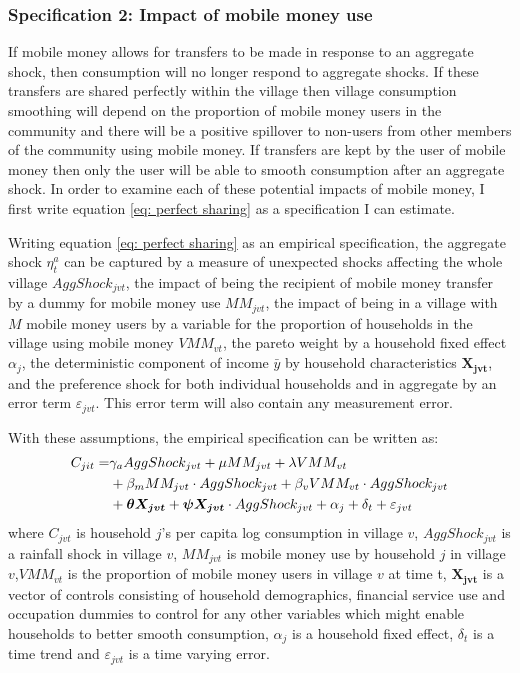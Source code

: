 \subsubsection{Specification 2: Impact of mobile money use}
If mobile money allows for transfers to be made in response to an aggregate shock, then consumption will no longer respond to aggregate shocks. If these transfers are shared perfectly within the village then village consumption smoothing will depend on the proportion of mobile money users in the community and there will be a positive spillover to non-users from other members of the community using mobile money. If transfers are kept by the user of mobile money then only the user will be able to smooth consumption after an aggregate shock. In order to examine each of these potential impacts of mobile money, I first write equation \ref{eq: perfect sharing} as a specification I can estimate.  

Writing equation \ref{eq: perfect sharing} as an empirical specification, the aggregate shock $\eta^a_t$ can be captured by a measure of unexpected shocks affecting the whole village $AggShock_{jvt}$, the impact of being the recipient of mobile money transfer by a dummy for mobile money use $MM_{jvt}$, the impact of being in a village with $M$ mobile money users by a variable for the proportion of households in the village using mobile money $VMM_{vt}$, the pareto weight by a household fixed effect $\alpha_j$, the deterministic component of income $\bar{y}$ by household characteristics $\bm{X_{jvt}}$, and the preference shock for both individual households and in aggregate by an error term $\varepsilon_{jvt}$. This error term will also contain any measurement error. 
 

With these assumptions, the empirical specification can be written as:
\begin{align} \label{eq: specification agg shock}
C_{jit} = &  \gamma_a AggShock_{jvt} + \mu MM_{jvt}   +\lambda VMM_{vt}  \notag \\
&  + \beta_m MM_{jvt}\cdot AggShock_{jvt} +\beta_v VMM_{vt}\cdot AggShock_{jvt} \notag \\
& + \bm{\theta X_{jvt}} +  \bm{\psi X_{jvt}} \cdot AggShock_{jvt} +  \alpha_j + \delta_t + \varepsilon_{jvt} 
\end{align}
where $C_{jvt}$ is household $j$'s per capita log consumption in village $v$, $AggShock_{jvt}$ is a rainfall shock in village $v$, $MM_{jvt}$ is mobile money use by household $j$ in village $v$,$VMM_{vt}$ is the proportion of mobile money users in village $v$ at time t, $\bm{X_{jvt}}$ is a vector of controls consisting of household demographics, financial service use and occupation dummies to control for any other variables which might enable households to better smooth consumption, $\alpha_j$ is a household fixed effect, $\delta_t$ is a time trend and $\varepsilon_{jvt}$ is a time varying error. 

